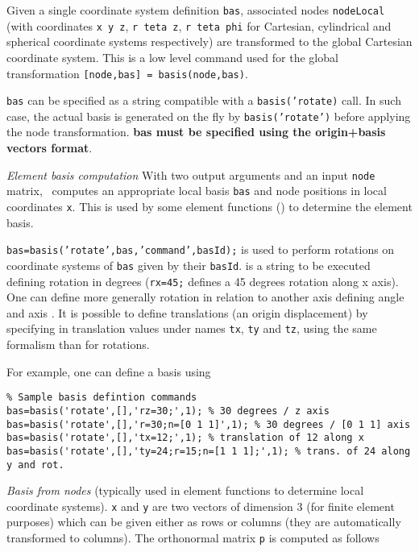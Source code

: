 Given a single coordinate system definition {\tt bas}, associated nodes {\tt nodeLocal} (with coordinates {\tt x y z}, {\tt r teta z}, {\tt r teta phi} for Cartesian, cylindrical and spherical coordinate systems respectively) are transformed to the global Cartesian coordinate system. This is a low level command used for the global transformation {\tt [node,bas] = basis(node,bas)}.

{\tt bas} can be specified as a string compatible with a {\tt basis('rotate)} call. In such case, the actual basis is generated on the fly by {\tt basis('rotate')} before applying the node transformation. {\bf bas must be specified using the origin+basis vectors format}.


{\sl Element basis computation} With two output arguments and an input {\tt node} matrix, \basis\ computes an appropriate local basis {\tt bas} and node positions in local coordinates {\tt x}. This is used by some element functions (\quada) to determine the element basis.


{\tt bas=basis('rotate',bas,'command',basId);} is used to perform rotations on coordinate systems of {\tt  bas} given by their {\tt basId}.  is a string to be executed defining rotation in degrees ({\tt rx=45;} defines a 45 degrees rotation along x axis). One can define more generally rotation in relation to another axis defining angle  and axis .
It is possible to define translations (an origin displacement) by specifying in  translation values under names {\tt tx}, {\tt ty} and {\tt tz}, using the same formalism than for rotations.

For example, one can define a basis using
\begin{verbatim}
% Sample basis defintion commands
bas=basis('rotate',[],'rz=30;',1); % 30 degrees / z axis
bas=basis('rotate',[],'r=30;n=[0 1 1]',1); % 30 degrees / [0 1 1] axis 
bas=basis('rotate',[],'tx=12;',1); % translation of 12 along x
bas=basis('rotate',[],'ty=24;r=15;n=[1 1 1];',1); % trans. of 24 along y and rot.
\end{verbatim}%



{\sl Basis from nodes} (typically used in element functions to determine local coordinate systems). {\tt x} and {\tt y} are two vectors of dimension 3 (for finite element purposes) which can be given either as rows or columns (they are automatically transformed to columns).  The orthonormal matrix 
{\tt p} is computed as follows


